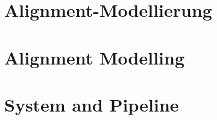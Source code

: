\documentclass[11pt,a4paper,oneside,openany]{scrbook}
\newif\ifaimGerman
\theoremstyle{plain}
\theoremstyle{definition}
\theoremstyle{remark}
\begin{document}
  \part{Alignment-Modellierung}
\else
  \part{Alignment Modelling}
\fi

\ifaimGerman
  
\else
  
\fi


\ifaimGerman
  
\else
  
\fi
\ifaimGerman
  
\else
  
\fi
\ifaimGerman
  
\else
  
\fi


\ifaimGerman
  
\else
  
\fi

\ifaimGerman
  \part{System und Verarbeitungskette}
\else
  \part{System and Pipeline}
\fi

\ifaimGerman
  
\else
  
\fi


\ifaimGerman
  
\else
  
\fi
\ifaimGerman
  
  
\else
  
  
\fi
\end{document}
